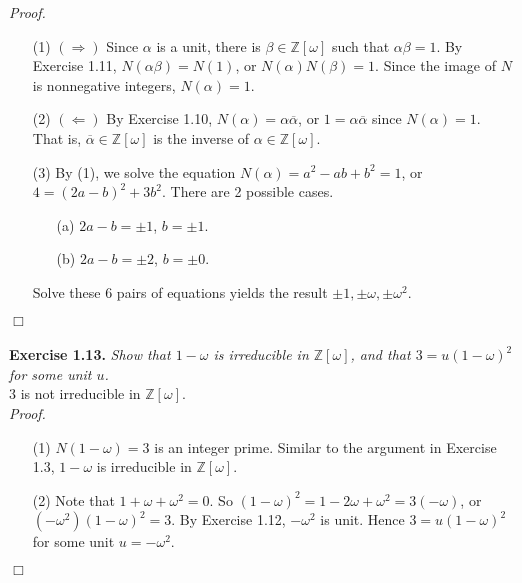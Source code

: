 \documentclass{article}
\begin{document}
\emph{Proof.}
\begin{enumerate}
\item[(1)]
\emph{$(\Longrightarrow)$}
Since $\alpha$ is a unit, there is $\beta \in \mathbb{Z}[\omega]$ such that
$\alpha \beta = 1$.
By Exercise 1.11, $N(\alpha \beta) = N(1)$, or $N(\alpha) N(\beta) = 1$.
Since the image of $N$ is nonnegative integers, $N(\alpha) = 1$.
\item[(2)]
\emph{$(\Longleftarrow)$}
By Exercise 1.10, $N(\alpha) = \alpha \overline{\alpha}$,
or $1 = \alpha \overline{\alpha}$ since $N(\alpha) = 1$.
That is, $\overline{\alpha} \in \mathbb{Z}[\omega]$ is
the inverse of $\alpha \in \mathbb{Z}[\omega]$.
\item[(3)]
By (1), we solve the equation $N(\alpha) = a^2 - ab + b^2 = 1$,
or $4 = (2a-b)^2 + 3b^2$.
There are 2 possible cases.
  \begin{enumerate}
  \item[(a)]
  $2a-b = \pm 1$, $b = \pm 1$.
  \item[(b)]
  $2a-b = \pm 2$, $b = \pm 0$.
  \end{enumerate}
  Solve these 6 pairs of equations yields the result
  $\pm 1, \pm \omega, \pm \omega^2$.
\end{enumerate}
$\Box$ \\\\






\textbf{Exercise 1.13.}
\emph{Show that $1-\omega$ is irreducible in $\mathbb{Z}[\omega]$,
and that $3 = u(1-\omega)^2$ for some unit $u$. } \\

$3$ is not irreducible in $\mathbb{Z}[\omega]$. \\

\emph{Proof.}
\begin{enumerate}
\item[(1)]
$N(1-\omega) = 3$ is an integer prime.
Similar to the argument in Exercise 1.3,
$1-\omega$ is irreducible in $\mathbb{Z}[\omega]$.
\item[(2)]
Note that $1+\omega+\omega^2=0$.
So
$(1-\omega)^2 = 1-2\omega+\omega^2 = 3(-\omega)$, or
$(-\omega^2)(1-\omega)^2 = 3$.
By Exercise 1.12, $-\omega^2$ is unit.
Hence $3 = u(1-\omega)^2$ for some unit $u = -\omega^2$.
\end{enumerate}
$\Box$ \\\\
\end{document}
